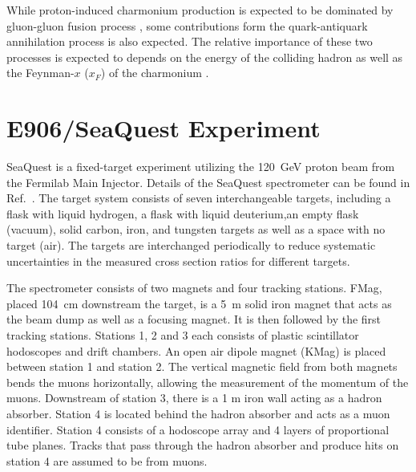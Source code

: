 \documentclass[10pt, a4paper,final]{article}
\begin{document}
While proton-induced charmonium production is expected to be dominated by gluon-gluon
fusion process \cite{vogt1999}, some contributions form the quark-antiquark
annihilation process is also expected. The relative importance of these two
processes is expected to depends on the energy of the colliding hadron as well
as the Feynman-$x$ ($x_F$) of the charmonium \cite{peng1995}.


\section{E906/SeaQuest Experiment}
\label{sec:e906}
SeaQuest is a fixed-target experiment utilizing the \SI{120}{\GeV} proton beam
from the Fermilab Main Injector. Details of the SeaQuest spectrometer can be
found in Ref.~\cite{aidala2019}. The target system consists of seven
interchangeable targets, including a flask with liquid hydrogen, a flask with
liquid deuterium,an empty flask (vacuum), solid carbon, iron, and tungsten
targets as well as a space with no target (air). The targets are interchanged
periodically to reduce systematic uncertainties in the measured cross section
ratios for different targets.

The spectrometer consists of two magnets and four tracking stations. FMag,
placed \SI{104}{\cm} downstream the target, is a \SI{5}{\m} solid iron magnet
that acts as the beam dump as well as a focusing magnet. It is then followed by
the first tracking stations. Stations 1, 2 and 3 each consists of plastic
scintillator hodoscopes and drift chambers. An open air dipole magnet (KMag) is
placed between station 1 and station 2. The vertical magnetic field from both
magnets bends the muons horizontally, allowing the measurement of the momentum
of the muons. Downstream of station 3, there is a 1 m iron wall acting as a
hadron absorber. Station 4 is located behind the hadron absorber and acts as a
muon identifier. Station 4 consists of a hodoscope array and 4 layers of
proportional tube planes. Tracks that pass through the hadron absorber and
produce hits on station 4 are assumed to be from muons.
\end{document}

